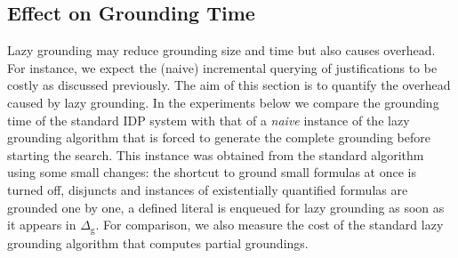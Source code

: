 \documentclass[11pt]{article}
\newcommand{\m}[1]{\ensuremath{#1}\xspace}
\newcommand{\D}{\m{\Delta}}
\theoremstyle{plain}
\theoremstyle{definition}
\theoremstyle{example_basic}
\theoremstyle{example_contd}
\theoremstyle{plain}
\newcommand{\Dg}{\ensuremath{\D_\text{g}}\xspace}
\newcommand{\change}[1]{#1}
\begin{document}
\subsection{Effect on Grounding Time}\label{ssec:overhead}
\change{Lazy grounding may reduce grounding size and time but also causes overhead. For instance, we expect the (naive) incremental querying of justifications to be costly  as discussed previously. The aim of this section is to quantify the overhead caused by lazy grounding. In the experiments below we compare the grounding time of the standard IDP system with that of  a \emph{naive} instance of the lazy grounding algorithm that is forced to generate the complete grounding before starting the search. This instance was obtained from the standard algorithm  using some small changes: the shortcut to ground small formulas at once is turned off, disjuncts and instances of existentially quantified formulas are grounded one by one, a defined literal is enqueued for lazy grounding as soon as it appears in \Dg. For comparison, we also measure the cost of the standard lazy grounding algorithm that computes partial groundings.}
\end{document}
